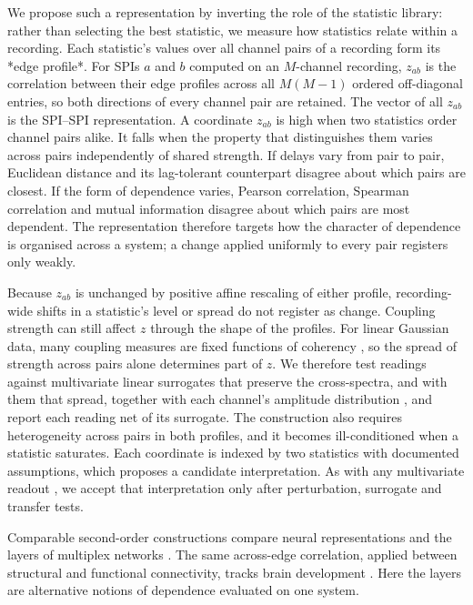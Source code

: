 \documentclass[pdflatex,sn-nature,iicol]{sn-jnl}
\begin{document}
We propose such a representation by inverting the role of the statistic library: rather than selecting the best statistic, we measure how statistics relate within a recording. Each statistic's values over all channel pairs of a recording form its *edge profile*. For SPIs $a$ and $b$ computed on an $M$-channel recording, $z_{ab}$ is the correlation between their edge profiles across all $M(M-1)$ ordered off-diagonal entries, so both directions of every channel pair are retained. The vector of all $z_{ab}$ is the SPI–SPI representation. A coordinate $z_{ab}$ is high when two statistics order channel pairs alike. It falls when the property that distinguishes them varies across pairs independently of shared strength. If delays vary from pair to pair, Euclidean distance and its lag-tolerant counterpart disagree about which pairs are closest. If the form of dependence varies, Pearson correlation, Spearman correlation and mutual information disagree about which pairs are most dependent. The representation therefore targets how the character of dependence is organised across a system; a change applied uniformly to every pair registers only weakly.

Because $z_{ab}$ is unchanged by positive affine rescaling of either profile, recording-wide shifts in a statistic's level or spread do not register as change. Coupling strength can still affect $z$ through the shape of the profiles. For linear Gaussian data, many coupling measures are fixed functions of coherency \cite{nolte2020mathematical}, so the spread of strength across pairs alone determines part of $z$. We therefore test readings against multivariate linear surrogates that preserve the cross-spectra, and with them that spread, together with each channel's amplitude distribution \cite{prichard1994generating,schreiber2000surrogate}, and report each reading net of its surrogate. The construction also requires heterogeneity across pairs in both profiles, and it becomes ill-conditioned when a statistic saturates. Each coordinate is indexed by two statistics with documented assumptions, which proposes a candidate interpretation. As with any multivariate readout \cite{haufe2014interpretation}, we accept that interpretation only after perturbation, surrogate and transfer tests.

Comparable second-order constructions compare neural representations \cite{kriegeskorte2008representational,kornblith2019similarity} and the layers of multiplex networks \cite{nicosia2015measuring,dedomenico2015structural}. The same across-edge correlation, applied between structural and functional connectivity, tracks brain development \cite{baum2020development}. Here the layers are alternative notions of dependence evaluated on one system.
\end{document}
